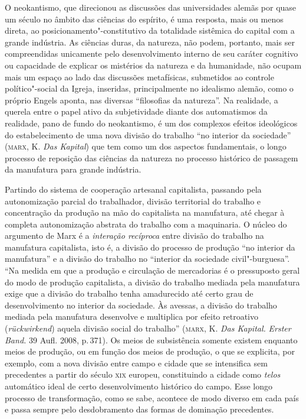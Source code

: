 O neokantismo, que direcionou as discussões das universidades alemãs por
quase um século no âmbito das ciências do espírito, é uma resposta, mais
ou menos direta, ao posicionamento"-constitutivo da totalidade sistêmica
do capital com a grande indústria. As ciências duras, da natureza, não
podem, portanto, mais ser compreendidas unicamente pelo desenvolvimento
interno de seu caráter cognitivo ou capacidade de explicar os mistérios
da natureza e da humanidade, não ocupam mais um espaço ao lado das
discussões metafísicas, submetidos ao controle político"-social da
Igreja, inseridas, principalmente no idealismo alemão, como o próprio
Engels aponta, nas diversas ``filosofias da natureza''. Na realidade, a
querela entre o papel ativo da subjetividade diante dos automatismos da
realidade, pano de fundo do neokantismo, é um dos complexos efeitos
ideológicos do estabelecimento de uma nova divisão do trabalho ``no
interior da sociedade'' (\textsc{marx}, K. \emph{Das Kapital}) que tem como um
dos aspectos fundamentais, o longo processo de reposição das ciências da
natureza no processo histórico de passagem da manufatura para grande
indústria.

Partindo do sistema de cooperação artesanal capitalista, passando pela
autonomização parcial do trabalhador, divisão territorial do trabalho e
concentração da produção na mão do capitalista na manufatura, até chegar
à completa autonomização abstrata do trabalho com a maquinaria. O núcleo
do argumento de Marx é a \emph{interação recíproca} entre divisão do
trabalho na manufatura capitalista, isto é, a divisão do processo de
produção ``no interior da manufatura'' e a divisão do trabalho no
``interior da sociedade civil"-burguesa''. ``Na medida em que a produção
e circulação de mercadorias é o pressuposto geral do modo de produção
capitalista, a divisão do trabalho mediada pela manufatura exige que a
divisão do trabalho tenha amadurecido até certo grau de desenvolvimento
no interior da sociedade. Às avessas, a divisão do trabalho mediada pela
manufatura desenvolve e multiplica por efeito retroativo
(\emph{rückwirkend}) aquela divisão social do trabalho'' (\textsc{marx}, K.
\emph{Das Kapital.} \emph{Erster Band.} 39 Aufl. 2008, p.\,371).
Os meios de subsistência somente existem enquanto meios de produção, ou
em função dos meios de produção, o que se explicita, por exemplo, com a
nova divisão entre campo e cidade que se intensifica sem precedentes a
partir do século \textsc{xix} europeu, constituindo a cidade como \emph{telos}
automático ideal de certo desenvolvimento histórico do campo. Esse longo
processo de transformação, como se sabe, acontece de modo diverso em
cada país e passa sempre pelo desdobramento das formas de dominação
precedentes.

